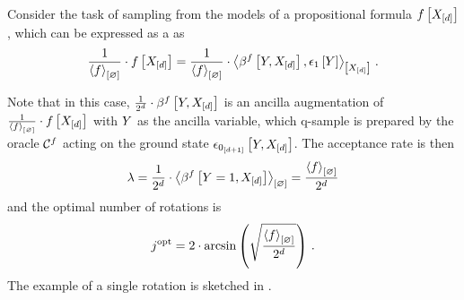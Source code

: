 \begin{example}

    Consider the task of sampling from the models of a propositional formula $f\left[X_{[d]}\right]$, which can be expressed as a \ComputationActivationNetwork{} as
    \begin{align*}
        \frac{1}{\contraction{\formula}} \cdot \formulawith
        = \frac{1}{\contraction{\formula}} \cdot \contractionof{\bencodingofat{\formula}{\headvariable,\shortcatvariables},\tbasisat{\headvariable}}{\shortcatvariables} \, .
    \end{align*}

    Note that in this case, $\frac{1}{2^{\catorder}} \cdot \bencodingofat{\formula}{\headvariable,\shortcatvariables}$ is an ancilla augmentation of $\frac{1}{\left\langle f\right\rangle_{\left[ \varnothing \right]}} \cdot f\left[X_{[d]}\right]$ with $Y$ as the ancilla variable, which q-sample is prepared by the oracle $\mathcal{C}^{f}$ acting on the ground state $\epsilon_{0_{[d+1]}}\left[Y,X_{[d]}\right]$.
    The acceptance rate is then
    \begin{align*}
        \acceptanceprob
        = \frac{1}{2^{\catorder}} \cdot \contraction{\bencodingofat{\formula}{\headvariable=1,\shortcatvariables}}
        = \frac{\contraction{\formula}}{2^{\catorder}}
    \end{align*}
    and the optimal number of rotations is
    \begin{align*}
        j^{\mathrm{opt}}
        = 2 \cdot \mathrm{arcsin}\left(\sqrt{\frac{\left\langle f\right\rangle_{\left[ \varnothing \right]}}{2^{d}}}\right) \, .
    \end{align*}
    The example of a single rotation is sketched in .

    \begin{figure}

\end{figure}
\end{example}
